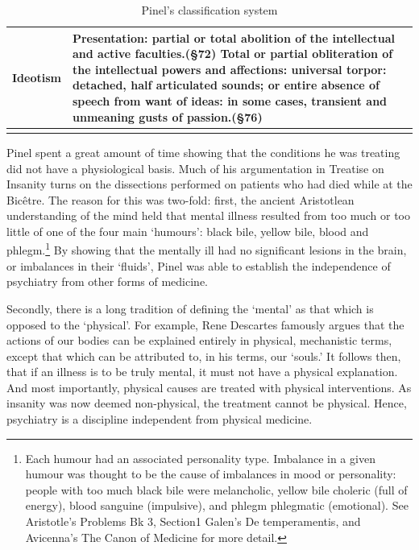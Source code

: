 \begin{refsection}
\begin{longtable}[!t]{ | P{2cm} | P{11cm}  | }
Ideotism&Presentation: partial or total abolition of the intellectual and active faculties.(\S 72) \newline
Total or partial obliteration of the intellectual powers and affections: universal torpor: detached, half articulated sounds; or entire absence of speech from want of ideas: in some cases, transient and unmeaning gusts of passion.(\S 76) \\ \hline
\caption{Pinel's classification system}
\label{table: pinel}
\end{longtable}


Pinel spent a great amount of time showing that the conditions he was treating did not have a physiological basis. Much of his argumentation in Treatise on Insanity turns on the dissections performed on patients who had died while at the Bicêtre. The reason for this was two-fold: first, the ancient Aristotlean understanding of the mind held that mental illness resulted from too much or too little of one of the four main `humours': black bile, yellow bile, blood and phlegm.\footnote{Each humour had an associated personality type. Imbalance in a given humour was thought to be the cause of imbalances in mood or personality: people with too much black bile were melancholic, yellow bile choleric (full of energy), blood sanguine (impulsive), and phlegm phlegmatic (emotional). See Aristotle's Problems Bk 3, Section1 Galen's De temperamentis, and Avicenna's The Canon of Medicine for more detail.} By showing that the mentally ill had no significant lesions in the brain, or imbalances in their `fluids', Pinel was able to establish the independence of psychiatry from other forms of medicine.

Secondly, there is a long tradition of defining the `mental' as that which is opposed to the `physical'. For example, Rene Descartes famously argues that the actions of our bodies can be explained entirely in physical, mechanistic terms, except that which can be attributed to, in his terms, our `souls.' It follows then, that if an illness is to be truly mental, it must not have a physical explanation. And most importantly, physical causes are treated with physical interventions. As insanity was now deemed non-physical, the treatment cannot be physical. Hence, psychiatry is a discipline independent from physical medicine.


\end{refsection}
